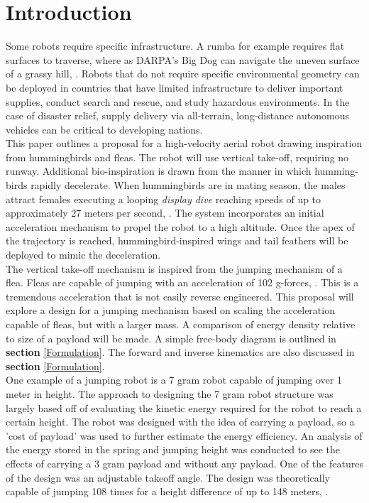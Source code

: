 \section{Introduction}
\label{intro}

\indent Some robots require specific infrastructure. A rumba for example requires flat surfaces to traverse, where as DARPA's Big Dog can navigate the uneven surface of a grassy hill, \cite{noauthor_bigdog_nodate}. Robots that do not require specific environmental geometry can be deployed in countries that have limited infrastructure to deliver important supplies, conduct search and rescue, and study hazardous environments. In the case of disaster relief, supply delivery via all-terrain, long-distance autonomous vehicles can be critical to developing nations.\\
\indent This paper outlines a proposal for a high-velocity aerial robot drawing
inspiration from hummingbirds and fleas. The robot will use vertical take-off, requiring no runway. Additional bio-inspiration is drawn from the manner in which humming-birds rapidly decelerate. When hummingbirds are in mating season, the males attract females executing a looping \textit{display dive} reaching speeds of up to approximately 27 meters per second, \cite{bennet-clark_jump_nodate}. The system incorporates an initial acceleration mechanism to propel the robot to a high altitude. Once the apex of the trajectory is reached, hummingbird-inspired wings and tail feathers will be deployed to mimic the deceleration.\\
\indent The vertical take-off mechanism is inspired from the jumping mechanism of a flea. Fleas are capable of jumping with an acceleration of 102 g-forces, \cite[p.~62]{bennet-clark_jump_nodate}. This is a tremendous acceleration that is not easily reverse engineered. This proposal will explore a design for a jumping mechanism based on scaling the acceleration capable of fleas, but with a larger mass. A comparison of energy density relative to size of a payload will be made. A simple free-body diagram is outlined in \textbf{section} \ref{Formulation}. The forward and inverse kinematics are also discussed in \textbf{section} \ref{Formulation}.\\
\indent One example of a jumping robot is a 7 gram robot capable of jumping over 1 meter in height. The approach to designing the 7 gram robot structure was largely based off of evaluating the kinetic energy required for the robot to reach a certain height. The robot was designed with the idea of carrying a payload, so a 'cost of payload' was used to further estimate the energy efficiency. An analysis of the energy stored in the spring and jumping height was conducted to see the effects of carrying a 3 gram payload and without any payload. One of the features of the design was an adjustable takeoff angle. The design was theoretically capable of jumping 108 times for a height difference of up to 148 meters, \cite{kovac_miniature_2008}. \\

